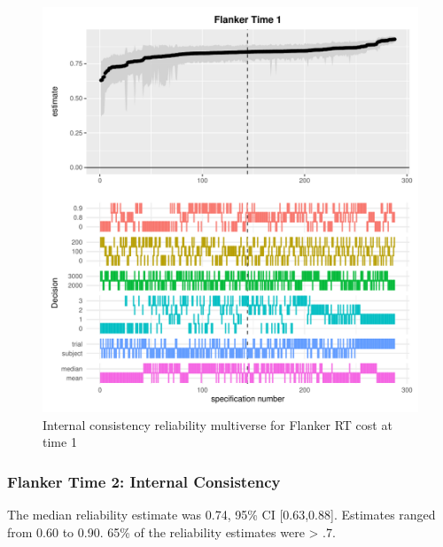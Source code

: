\documentclass[english,man,floatsintext]{apa6}
\begin{document}
\begin{figure}
\centering
\includegraphics{Reliability_Multiverse_files/figure-latex/unnamed-chunk-8-1.pdf}
\caption{\label{fig:unnamed-chunk-8}Internal consistency reliability multiverse for Flanker RT cost at time 1}
\end{figure}

\newpage

\hypertarget{flanker-time-2-internal-consistency}{%
\subsubsection{Flanker Time 2: Internal Consistency}\label{flanker-time-2-internal-consistency}}

The median reliability estimate was 0.74, 95\% CI {[}0.63,0.88{]}. Estimates ranged from 0.60 to 0.90. 65\% of the reliability estimates were \textgreater{} .7.
\end{document}
